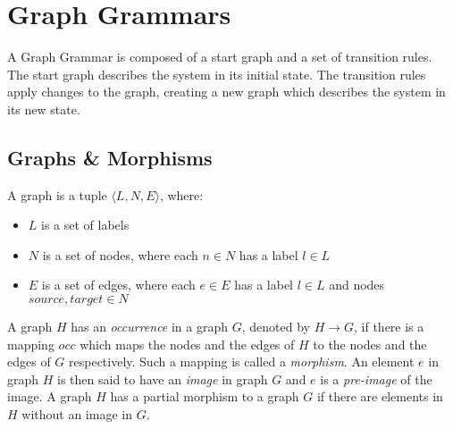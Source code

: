 \section{Graph Grammars}\label{sec:graph}
A Graph Grammar is composed of a start graph and a set of transition rules. The start graph describes the system in its initial state. The transition rules apply changes to the graph, creating a new graph which describes the system in its new state. 

\subsection{Graphs \& Morphisms}
\begin{definition}
A graph is a tuple $\langle L, N, E\rangle$, where:
\begin{itemize}
  \item $L$ is a set of labels
  \item $N$ is a set of nodes, where each $n \in N$ has a label $l \in L$
  \item $E$ is a set of edges, where each $e \in E$ has a label $l \in L$ and nodes $source,target \in N$
\end{itemize}
\end{definition}


A graph $H$ has an \textit{occurrence} in a graph $G$, denoted by $H \rightarrow G$, if there is a mapping $occ$ which maps the nodes and the edges of $H$ to the nodes and the edges of $G$ respectively. Such a mapping is called a \textit{morphism}. An element $e$ in graph $H$ is then said to have an \textit{image} in graph $G$ and $e$ is a \textit{pre-image} of the image. A graph $H$ has a partial morphism to a graph $G$ if there are elements in $H$ without an image in $G$.

